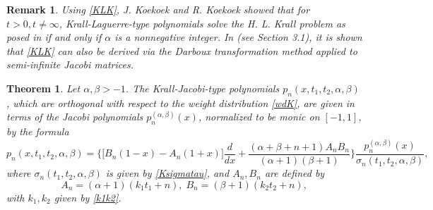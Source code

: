 \documentclass[10pt, reqno]{amsart}
\numberwithin{equation}{section}
\newtheorem{theorem}{Theorem}[section]
\newtheorem{remark}{Remark}[section]
\numberwithin{equation}{section}
\begin{document}
\begin{remark} \label{remark 6.1} 
\emph{Using \eqref{KLK}, J. Koekoek and R. Koekoek \cite{KK1} showed  that for $t>0, t\neq \infty$, Krall-Laguerre-type polynomials solve the H. L. Krall problem as posed in \cite{K1} if and only if $\alpha$ is a nonnegative integer. In \cite{GHH} (see Section 3.1), it is shown that \eqref{KLK} can also be derived via the Darboux transformation method applied to semi-infinite Jacobi matrices.}
\end{remark}
\begin{theorem} \label{theorem 6.2}
Let $\alpha, \beta>-1$. The Krall-Jacobi-type polynomials $p_n(x, t_1, t_2, \alpha, \beta)$, which are orthogonal with respect to the weight distribution \eqref{wdK}, are given in terms of the Jacobi polynomials $p_n^{(\alpha, \beta)}(x)$, normalized to be monic on $[-1,1]$, by the formula 
\begin{equation}
p_n(x, t_1, t_2, \alpha, \beta)=\Bigg\{\Big[B_n(1-x)-A_n(1+x)\Big]\frac{d}{dx}+ \frac{(\alpha+\beta+n+1)A_nB_n}{(\alpha+1)(\beta+1)}\Bigg\}\frac{p_n^{(\alpha,\beta)}(x)}{\sigma_n(t_1,t_2,\alpha,\beta)},\label{Kd}
\end{equation}
where $\sigma_n(t_1,t_2,\alpha,\beta)$ is given by \eqref{Ksigmatau}, and $A_n, B_n$ are defined by
\begin{equation} 
A_n=(\alpha+1)(k_1t_1+n),\; B_n=(\beta+1)(k_2t_2+n),\label{cKd}
\end{equation}
with $k_1,k_2$ given by \eqref{k1k2}.
\end{theorem}
\end{document}
